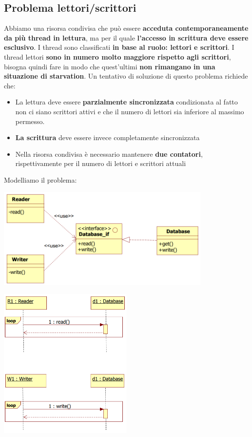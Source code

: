 \documentclass[12pt]{article}
\begin{document}
\subsection{Problema lettori/scrittori}
Abbiamo una risorsa condivisa che può essere \textbf{acceduta contemporaneamente da più thread in lettura}, ma per il quale \textbf{l'accesso in scrittura deve essere esclusivo}. I thread sono classificati \textbf{in base al ruolo: lettori e scrittori}. I thread lettori \textbf{sono in numero molto maggiore rispetto agli scrittori}, bisogna quindi fare in modo che quest'ultimi \textbf{non rimangano in una situazione di starvation}. Un tentativo di soluzione di questo problema richiede che:
\begin{itemize}
    \item La lettura deve essere \textbf{parzialmente sincronizzata} condizionata al fatto non ci siano scrittori attivi e che il numero di lettori sia inferiore al massimo permesso.
    \item \textbf{La scrittura} deve essere invece completamente sincronizzata
    \item Nella risorsa condivisa è necessario mantenere \textbf{due contatori}, rispettivamente per il numero di lettori e scrittori attuali
\end{itemize}
Modelliamo il problema:
\begin{center}
    \includegraphics[width = 0.80\textwidth]{Images/109.PNG}
\end{center}
\begin{center}
    \includegraphics[width = 0.50\textwidth]{Images/110.PNG}
\end{center}
\end{document}
